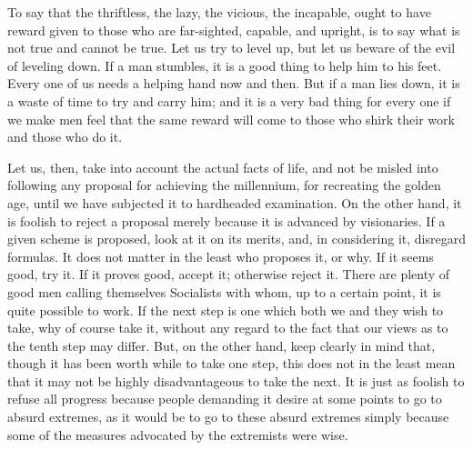 \documentclass[a4paper]{amsbook}
\begin{document}
To say that the thriftless, the lazy, the vicious, the incapable, ought to have reward given to those who are far-sighted, capable, and upright, is to say what is not true and cannot be true. Let us try to level up, but let us beware of the evil of leveling down. If a man stumbles, it is a good thing to help him to his feet. Every one of us needs a helping hand now and then. But if a man lies down, it is a waste of time to try and carry him; and it is a very bad thing for every one if we make men feel that the same reward will come to those who shirk their work and those who do it.

Let us, then, take into account the actual facts of life, and not be misled into following any proposal for achieving the millennium, for recreating the golden age, until we have subjected it to hardheaded examination. On the other hand, it is foolish to reject a proposal merely because it is advanced by visionaries. If a given scheme is proposed, look at it on its merits, and, in considering it, disregard formulas. It does not matter in the least who proposes it, or why. If it seems good, try it. If it proves good, accept it; otherwise reject it. There are plenty of good men calling themselves Socialists with whom, up to a certain point, it is quite possible to work. If the next step is one which both we and they wish to take, why of course take it, without any regard to the fact that our views as to the tenth step may differ. But, on the other hand, keep clearly in mind that, though it has been worth while to take one step, this does not in the least mean that it may not be highly disadvantageous to take the next. It is just as foolish to refuse all progress because people demanding it desire at some points to go to absurd extremes, as it would be to go to these absurd extremes simply because some of the measures advocated by the extremists were wise.
\end{document}
